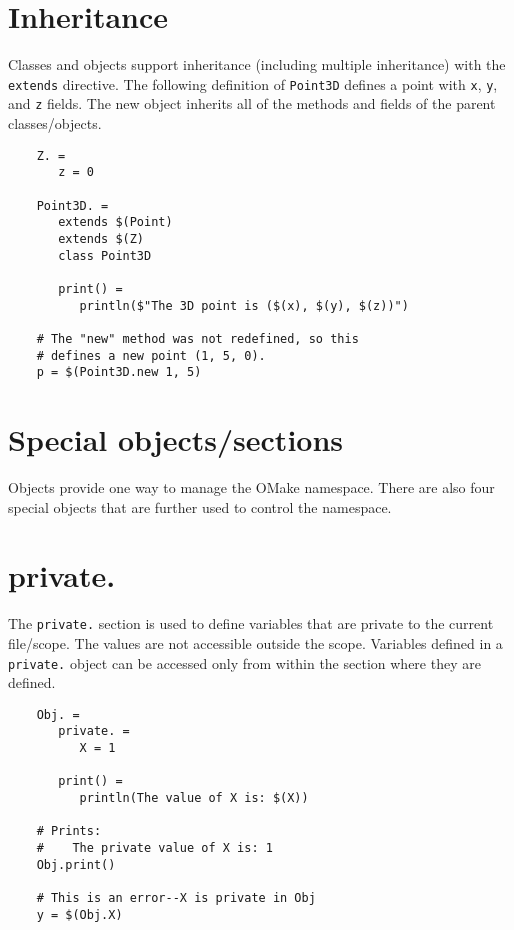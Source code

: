 \section{Inheritance}

Classes and objects support inheritance (including multiple inheritance) with the \verb+extends+
directive.  The following definition of \verb+Point3D+ defines a point with \verb+x+, \verb+y+, and
\verb+z+ fields.  The new object inherits all of the methods and fields of the parent classes/objects.

\begin{verbatim}
    Z. =
       z = 0

    Point3D. =
       extends $(Point)
       extends $(Z)
       class Point3D

       print() =
          println($"The 3D point is ($(x), $(y), $(z))")

    # The "new" method was not redefined, so this
    # defines a new point (1, 5, 0).
    p = $(Point3D.new 1, 5)
\end{verbatim}

\section{Special objects/sections}

Objects provide one way to manage the OMake namespace.  There are also four special objects that are
further used to control the namespace.

\section{private.}

The \verb+private.+ section is used to define variables that are private to the current file/scope.
The values are not accessible outside the scope.  Variables defined in a \verb+private.+ object can
be accessed only from within the section where they are defined.

\begin{verbatim}
    Obj. =
       private. =
          X = 1

       print() =
          println(The value of X is: $(X))

    # Prints:
    #    The private value of X is: 1
    Obj.print()

    # This is an error--X is private in Obj
    y = $(Obj.X)
\end{verbatim}

